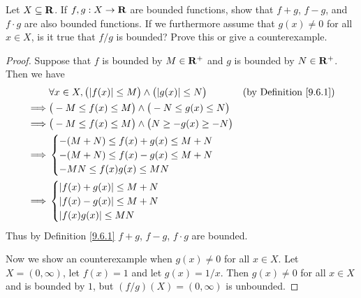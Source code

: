 \begin{exercise}\label{ex 9.6.2}
    Let \(X \subseteq \mathbf{R}\).
    If \(f, g: X \to \mathbf{R}\) are bounded functions, show that \(f + g\), \(f - g\), and \(f \cdot g\) are also bounded functions.
    If we furthermore assume that \(g(x) \neq 0\) for all \(x \in X\), is it true that \(f / g\) is bounded?
    Prove this or give a counterexample.
\end{exercise}

\begin{proof}
    Suppose that \(f\) is bounded by \(M \in \mathbf{R}^+\) and \(g\) is bounded by \(N \in \mathbf{R}^+\).
    Then we have
    \begin{align*}
                 & \forall x \in X, \big(\abs{f(x)} \leq M\big) \land \big(\abs{g(x)} \leq N\big) & \text{(by Definition \ref{9.6.1})} \\
        \implies & \big(-M \leq f(x) \leq M\big) \land \big(-N \leq g(x) \leq N\big)                                                   \\
        \implies & \big(-M \leq f(x) \leq M\big) \land \big(N \geq -g(x) \geq -N\big)                                                  \\
        \implies & \begin{cases}
                       -(M + N) \leq f(x) + g(x) \leq M + N \\
                       -(M + N) \leq f(x) - g(x) \leq M + N \\
                       -MN \leq f(x) g(x) \leq MN
                   \end{cases}                                                                                \\
        \implies & \begin{cases}
                       \abs{f(x) + g(x)} \leq M + N \\
                       \abs{f(x) - g(x)} \leq M + N \\
                       \abs{f(x) g(x)} \leq MN
                   \end{cases}
    \end{align*}
    Thus by Definition \ref{9.6.1} \(f + g\), \(f - g\), \(f \cdot g\) are bounded.

    Now we show an counterexample when \(g(x) \neq 0\) for all \(x \in X\).
    Let \(X = (0, \infty)\), let \(f(x) = 1\) and let \(g(x) = 1 / x\).
    Then \(g(x) \neq 0\) for all \(x \in X\) and is bounded by \(1\), but \((f / g)(X) = (0, \infty)\) is unbounded.
\end{proof}